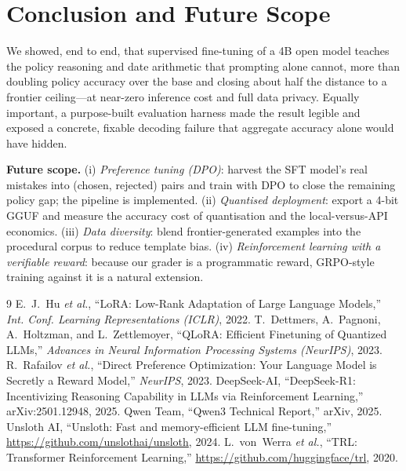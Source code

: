\documentclass[conference]{IEEEtran}
\begin{document}
\section{Conclusion and Future Scope}
We showed, end to end, that supervised fine-tuning of a 4B open model teaches
the policy reasoning and date arithmetic that prompting alone cannot, more than
doubling policy accuracy over the base and closing about half the distance to a
frontier ceiling---at near-zero inference cost and full data privacy. Equally
important, a purpose-built evaluation harness made the result legible and
exposed a concrete, fixable decoding failure that aggregate accuracy alone
would have hidden.

\textbf{Future scope.} (i) \emph{Preference tuning (DPO)}: harvest the SFT
model's real mistakes into (chosen, rejected) pairs and train with DPO to close
the remaining policy gap; the pipeline is implemented. (ii) \emph{Quantised
deployment}: export a 4-bit GGUF and measure the accuracy cost of quantisation
and the local-versus-API economics. (iii) \emph{Data diversity}: blend
frontier-generated examples into the procedural corpus to reduce template bias.
(iv) \emph{Reinforcement learning with a verifiable reward}: because our grader
is a programmatic reward, GRPO-style training against it is a natural extension.

\begin{thebibliography}{9}
 E.~J.~Hu \emph{et al.}, ``LoRA: Low-Rank Adaptation of Large
Language Models,'' \emph{Int. Conf. Learning Representations (ICLR)}, 2022.
 T.~Dettmers, A.~Pagnoni, A.~Holtzman, and L.~Zettlemoyer,
``QLoRA: Efficient Finetuning of Quantized LLMs,'' \emph{Advances in Neural
Information Processing Systems (NeurIPS)}, 2023.
 R.~Rafailov \emph{et al.}, ``Direct Preference Optimization: Your
Language Model is Secretly a Reward Model,'' \emph{NeurIPS}, 2023.
 DeepSeek-AI, ``DeepSeek-R1: Incentivizing Reasoning
Capability in LLMs via Reinforcement Learning,'' arXiv:2501.12948, 2025.
 Qwen Team, ``Qwen3 Technical Report,'' arXiv, 2025.
 Unsloth AI, ``Unsloth: Fast and memory-efficient LLM
fine-tuning,'' \url{https://github.com/unslothai/unsloth}, 2024.
 L.~von~Werra \emph{et al.}, ``TRL: Transformer Reinforcement
Learning,'' \url{https://github.com/huggingface/trl}, 2020.
\end{thebibliography}
\end{document}
